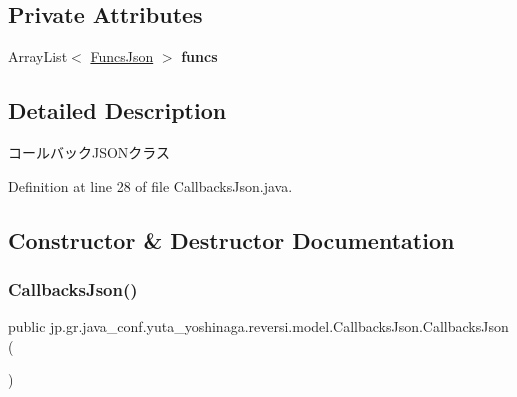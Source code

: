 \subsection*{Private Attributes}
\begin{DoxyCompactItemize}
\item 
\mbox{\label{classjp_1_1gr_1_1java__conf_1_1yuta__yoshinaga_1_1reversi_1_1model_1_1_callbacks_json_acbc23906e4e1cd6ff59a46ee2d7e1a85}} 
Array\+List$<$ \mbox{\hyperlink{classjp_1_1gr_1_1java__conf_1_1yuta__yoshinaga_1_1reversi_1_1model_1_1_funcs_json}{Funcs\+Json}} $>$ {\bfseries funcs}
\end{DoxyCompactItemize}


\subsection{Detailed Description}
コールバック\+J\+S\+O\+Nクラス 

Definition at line 28 of file Callbacks\+Json.\+java.



\subsection{Constructor \& Destructor Documentation}
\mbox{\label{classjp_1_1gr_1_1java__conf_1_1yuta__yoshinaga_1_1reversi_1_1model_1_1_callbacks_json_acdc36faba755660c46ab3d1641d18e67}} 
\subsubsection{\texorpdfstring{Callbacks\+Json()}{CallbacksJson()}}
{\footnotesize\ttfamily public jp.\+gr.\+java\+\_\+conf.\+yuta\+\_\+yoshinaga.\+reversi.\+model.\+Callbacks\+Json.\+Callbacks\+Json (\begin{DoxyParamCaption}{ }\end{DoxyParamCaption})}




